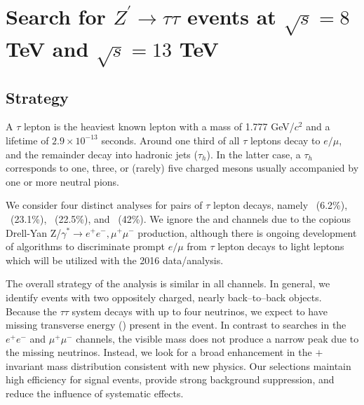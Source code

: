 \chapter{Search for $Z^{\prime}\to\tau\tau$ events at $\sqrt{s} = 8$ TeV and $\sqrt{s} = 13$ TeV}

\section{Strategy}\label{sec:strategy}
A $\tau$ lepton is the heaviest known lepton with a mass of 1.777 GeV/$c^2$ and a lifetime of $2.9\times10^{-13}$ seconds. Around one third of
all $\tau$ leptons decay to $e/\mu$, and the remainder decay into hadronic jets ($\tau_{h}$). 
In the latter case, a $\tau_{h}$ corresponds to one, three, or (rarely) five charged mesons usually accompanied by one or
more neutral pions.

We consider four distinct analyses for pairs of $\tau$ lepton decays, namely \emu ~(6.2\%), \etau ~(23.1\%), \mutau  ~(22.5\%), and
\ditauhad ~(42\%). We ignore the \EE and \MM channels due to the copious Drell-Yan
Z/$\gamma^*\rightarrow e^+e^-, \mu^+\mu^-$ production, although there is ongoing development of algorithms to discriminate prompt $e/\mu$ from $\tau$ lepton 
decays to light leptons which will be utilized with the 2016 data/analysis.

The overall strategy of the analysis is similar in all channels. 
In general, we identify events with two oppositely charged, nearly back--to--back objects. Because the $\tau\tau$ system decays with up
to four neutrinos, we expect to have missing transverse energy (\MET) present in the event. In contrast to \zprime searches in the
$e^+e^-$ and $\mu^+\mu^-$ channels, the visible \ditau mass does not produce a narrow peak due to the missing neutrinos.
Instead, we look for a broad enhancement in the \ditau$+$\MET invariant mass distribution consistent with new physics.  Our
selections maintain high efficiency for signal events, provide strong background suppression, and reduce the influence of systematic
effects.  

